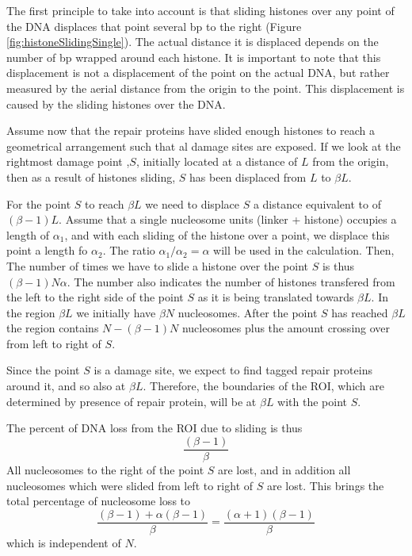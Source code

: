 \documentclass[12pt]{paper}
\begin{document}
     The first principle to take into account is that sliding histones over any point of the DNA displaces that point several bp to the right (Figure \ref{fig:histoneSlidingSingle}). The actual distance it is displaced depends on the number of bp wrapped around each histone. It is important to note that this displacement is not a displacement of the point on the actual DNA, but rather measured by the aerial distance from the origin to the point. This displacement is caused by the sliding histones over the DNA.
     
     Assume now that the repair proteins have slided enough histones to reach a geometrical arrangement such that al damage sites are exposed. If we look at the rightmost damage point ,$S$, initially located at a distance of $L$ from the origin, then as a result of histones sliding, $S$ has been displaced from $L$ to $\beta L$. 
     
     For the point $S$ to reach $\beta L$ we need to displace $S$ a distance equivalent to of $(\beta-1)L$. Assume that a single nucleosome units (linker + histone) occupies a length of $\alpha_1$, and with each sliding of the histone over a point, we displace this point a length fo $\alpha_2$. The ratio $\alpha_1/\alpha_2 =\alpha$ will be used in the calculation. Then, The number of times we have to slide a histone over the point $S$ is thus $(\beta-1)N\alpha$.
     The number also indicates the number of histones transfered from the left to the right side of the point $S$ as it is being translated towards $\beta L$.
     In the region $\beta L$ we initially have $\beta N$ nucleosomes. After the point $S$ has reached $\beta L$ the region contains $N-(\beta-1)N$ nucleosomes plus the amount crossing over from left to right of $S$. 
     
     Since the point $S$ is a damage site, we expect to find tagged repair proteins around it, and so also at $\beta L$. Therefore, the  boundaries of the ROI, which are determined by presence of repair protein, will be at $\beta L$ with the point $S$. 
     
     The percent of DNA loss from the ROI due to sliding is thus 
     \begin{equation}
     \frac{(\beta-1)}{\beta}
     \end{equation}
     All nucleosomes to the right of the point $S$ are lost, and in addition all nucleosomes which were slided from left to right of $S$ are lost. This brings the total percentage of nucleosome loss to 
     \begin{equation*}
     \frac{(\beta-1) +\alpha(\beta -1)}{\beta}= \frac{(\alpha+1)(\beta -1)}{\beta}
     \end{equation*}
     which is independent of $N$.
     
\end{document}
